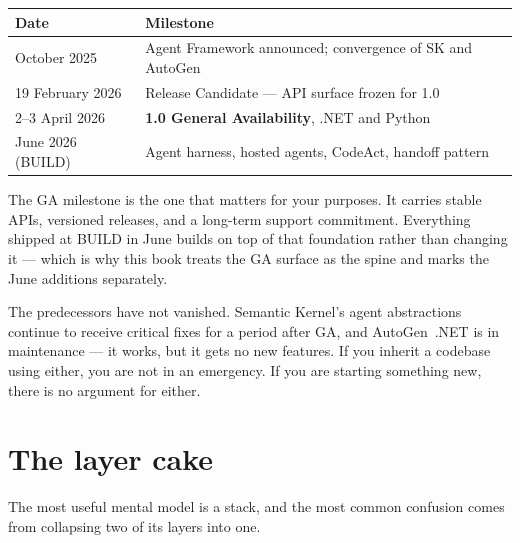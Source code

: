 \begin{center}
\begin{tabular}{@{}ll@{}}
\toprule
\textbf{Date} & \textbf{Milestone} \\
\midrule
October 2025      & Agent Framework announced; convergence of SK and AutoGen \\
19 February 2026  & Release Candidate --- API surface frozen for 1.0 \\
2--3 April 2026   & \textbf{1.0 General Availability}, .NET and Python \\
June 2026 (BUILD) & Agent harness, hosted agents, CodeAct, handoff pattern \\
\bottomrule
\end{tabular}
\end{center}

The GA milestone is the one that matters for your purposes. It carries stable
APIs, versioned releases, and a long-term support commitment. Everything shipped
at BUILD in June builds on top of that foundation rather than changing it ---
which is why this book treats the GA surface as the spine and marks the June
additions separately.

\begin{note}
The predecessors have not vanished. Semantic Kernel's agent abstractions
continue to receive critical fixes for a period after GA, and AutoGen~.NET is in
maintenance --- it works, but it gets no new features. If you inherit a codebase
using either, you are not in an emergency. If you are starting something new,
there is no argument for either.
\end{note}

\section{The layer cake}
\label{sec:layercake}

The most useful mental model is a stack, and the most common confusion comes
from collapsing two of its layers into one.


